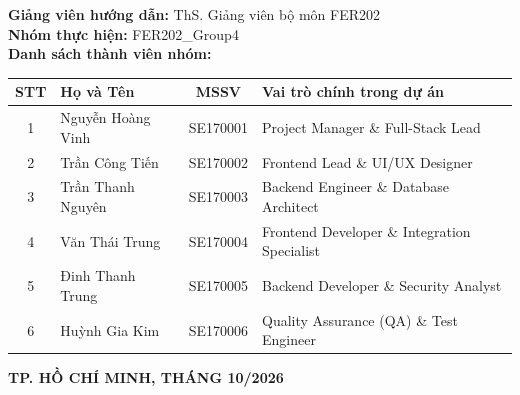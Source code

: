\begin{titlepage}
\begin{center}
\vfill
\begin{minipage}{0.9\textwidth}
\begin{flushleft}
\fontsize{12pt}{15pt}\selectfont
\textbf{Giảng viên hướng dẫn:} ThS. Giảng viên bộ môn FER202\\[0.3cm]
\textbf{Nhóm thực hiện:} FER202\_Group4\\[0.3cm]
\textbf{Danh sách thành viên nhóm:}\\[0.15cm]
\begin{tabular}{|c|l|c|l|}
\hline
\textbf{STT} & \textbf{Họ và Tên} & \textbf{MSSV} & \textbf{Vai trò chính trong dự án} \\ \hline
1 & Nguyễn Hoàng Vinh & SE170001 & Project Manager \& Full-Stack Lead \\ \hline
2 & Trần Công Tiến & SE170002 & Frontend Lead \& UI/UX Designer \\ \hline
3 & Trần Thanh Nguyên & SE170003 & Backend Engineer \& Database Architect \\ \hline
4 & Văn Thái Trung & SE170004 & Frontend Developer \& Integration Specialist \\ \hline
5 & Đinh Thanh Trung & SE170005 & Backend Developer \& Security Analyst \\ \hline
6 & Huỳnh Gia Kim & SE170006 & Quality Assurance (QA) \& Test Engineer \\ \hline
\end{tabular}
\end{flushleft}
\end{minipage}

\vfill
{\fontsize{12pt}{14pt}\selectfont \textbf{TP. HỒ CHÍ MINH, THÁNG 10/2026}}

\end{center}
\end{titlepage}

